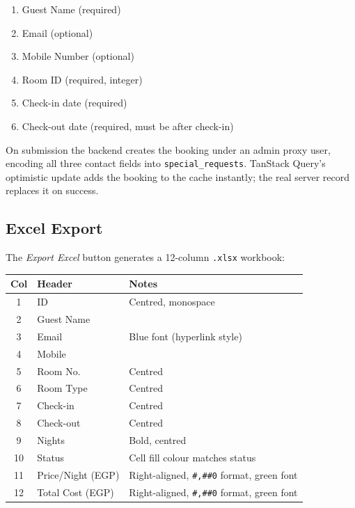 \documentclass[12pt,a4paper]{report}
\begin{document}
\begin{enumerate}[leftmargin=2em]
  \item Guest Name (required)
  \item Email (optional)
  \item Mobile Number (optional)
  \item Room ID (required, integer)
  \item Check-in date (required)
  \item Check-out date (required, must be after check-in)
\end{enumerate}

On submission the backend creates the booking under an admin proxy user,
encoding all three contact fields into \texttt{special\_requests}. TanStack
Query's optimistic update adds the booking to the cache instantly; the real
server record replaces it on success.

\subsection{Excel Export}

The \emph{Export Excel} button generates a 12-column \texttt{.xlsx} workbook:

\begin{center}
\begin{tabular}{clp{6.5cm}}
  \toprule
  \textbf{Col} & \textbf{Header} & \textbf{Notes} \\
  \midrule
  1  & ID              & Centred, monospace \\
  2  & Guest Name      & \\
  3  & Email           & Blue font (hyperlink style) \\
  4  & Mobile          & \\
  5  & Room No.        & Centred \\
  6  & Room Type       & Centred \\
  7  & Check-in        & Centred \\
  8  & Check-out       & Centred \\
  9  & Nights          & Bold, centred \\
  10 & Status          & Cell fill colour matches status \\
  11 & Price/Night (EGP) & Right-aligned, \texttt{\#,\#\#0} format, green font \\
  12 & Total Cost (EGP)  & Right-aligned, \texttt{\#,\#\#0} format, green font \\
  \bottomrule
\end{tabular}
\end{center}
\end{document}
